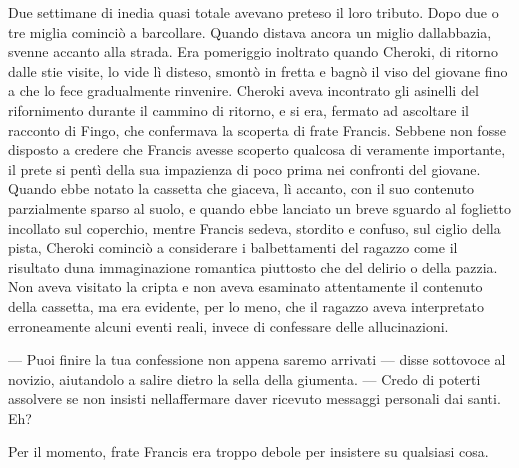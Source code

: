 Due settimane di inedia quasi totale avevano preteso il loro tributo.
Dopo due o tre miglia cominciò a barcollare. Quando distava ancora un
miglio dall\textquotesingle abbazia, svenne accanto alla strada. Era
pomeriggio inoltrato quando Cheroki, di ritorno dalle stie visite, lo
vide lì disteso, smontò in fretta e bagnò il viso del giovane fino a che
lo fece gradualmente rinvenire. Cheroki aveva incontrato gli asinelli
del rifornimento durante il cammino di ritorno, e si era, fermato ad
ascoltare il racconto di Fingo, che confermava la scoperta di frate
Francis. Sebbene non fosse disposto a credere che Francis avesse
scoperto qualcosa di veramente importante, il prete si pentì della sua
impazienza di poco prima nei confronti del giovane. Quando ebbe notato
la cassetta che giaceva, lì accanto, con il suo contenuto parzialmente
sparso al suolo, e quando ebbe lanciato un breve sguardo al foglietto
incollato sul coperchio, mentre Francis sedeva, stordito e confuso, sul
ciglio della pista, Cheroki cominciò a considerare i balbettamenti del
ragazzo come il risultato d\textquotesingle una immaginazione romantica
piuttosto che del delirio o della pazzia. Non aveva visitato la cripta e
non aveva esaminato attentamente il contenuto della cassetta, ma era
evidente, per lo meno, che il ragazzo aveva interpretato erroneamente
alcuni eventi reali, invece di confessare delle allucinazioni.

--- Puoi finire la tua confessione non appena saremo arrivati --- disse
sottovoce al novizio, aiutandolo a salire dietro la sella della
giumenta. --- Credo di poterti assolvere se non insisti
nell\textquotesingle affermare d\textquotesingle aver ricevuto messaggi
personali dai santi. Eh?

Per il momento, frate Francis era troppo debole per insistere su
qualsiasi cosa.
